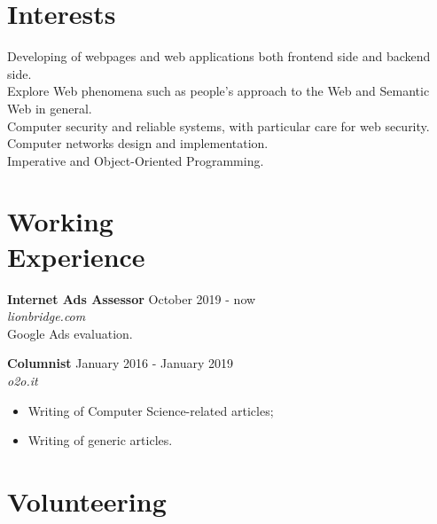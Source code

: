 \documentclass[margin, 10pt]{res}
\begin{document}
\begin{resume}

\section{Interests}
Developing of webpages and web applications both frontend side and backend side. \\
Explore Web phenomena such as people's approach to the Web and Semantic Web in general. \\
Computer security and reliable systems, with particular care for web security. \\
Computer networks design and implementation. \\
Imperative and Object-Oriented Programming. \\



 
\section{Working \\ Experience}

\textbf{Internet Ads Assessor} \hfill October 2019 - now \\
\textit{lionbridge.com} \\
Google Ads evaluation.

\textbf{Columnist} \hfill January 2016 - January 2019 \\
\textit{o2o.it}
\begin{itemize}
\item Writing of Computer Science-related articles;
\item Writing of generic articles.
\end{itemize} 



\section{Volunteering}


\end{resume}
\end{document}
